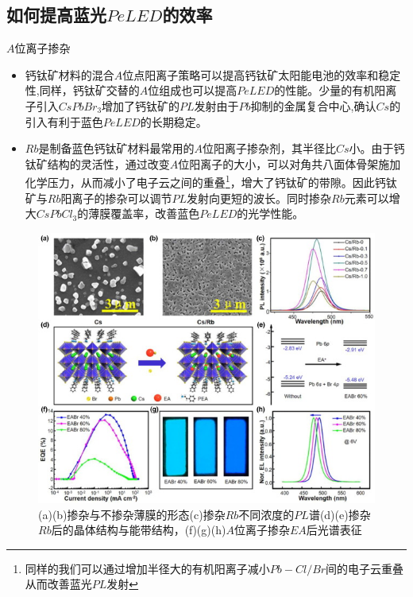\documentclass{beamer}[fontset=windows]
\begin{document}
\subsection{如何提高蓝光$PeLED$的效率}
\begin{frame}
\begin{block}{$A$位离子掺杂}
\begin{itemize}
\item 钙钛矿材料的混合$A$位点阳离子策略可以提高钙钛矿太阳能电池的效率和稳定性,同样，钙钛矿交替的$A$位组成也可以提高$PeLED$的性能。少量的有机阳离子引入$CsPbBr_{3}$增加了钙钛矿的$PL$发射由于$Pb$抑制的金属复合中心,确认$Cs$的引入有利于蓝色$PeLED$的长期稳定。
\item $Rb$是制备蓝色钙钛矿材料最常用的$A$位阳离子掺杂剂，其半径比$Cs$小。由于钙钛矿结构的灵活性，通过改变$A$位阳离子的大小，可以对角共八面体骨架施加化学压力，从而减小了电子云之间的重叠\footnote{同样的我们可以通过增加半径大的有机阳离子减小$Pb-Cl/Br$间的电子云重叠从而改善蓝光$PL$发射}，增大了钙钛矿的带隙。因此钙钛矿与$Rb$阳离子的掺杂可以调节$PL$发射向更短的波长。同时掺杂$Rb$元素可以增大$CsPbCl_{3}$的薄膜覆盖率，改善蓝色$PeLED$的光学性能。
\end{itemize}
\end{block}
\end{frame}
\begin{frame}
	\begin{figure}[H]
		\centering
		\hspace{2em}\includegraphics[width=.7\linewidth]{pic/8.jpg}
		\caption{(a)(b)掺杂与不掺杂薄膜的形态(c)掺杂$Rb$不同浓度的$PL$谱(d)(e)掺杂$Rb$后的晶体结构与能带结构，(f)(g)(h)$A$位离子掺杂$EA$后光谱表征\cite{zhang2021blue}
		}
	\end{figure}
\end{frame}
\end{document}
